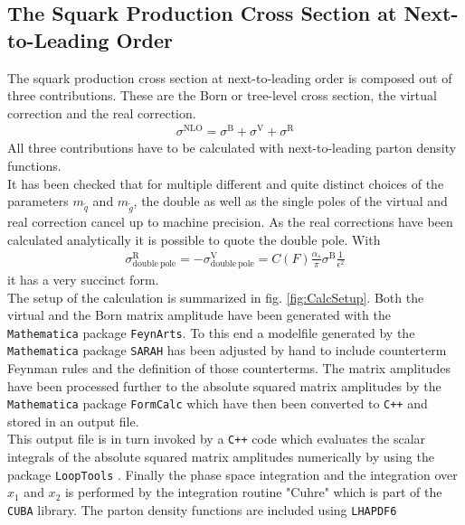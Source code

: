 \subsection{The Squark Production Cross Section at Next-to-Leading Order}
The squark production cross section at next-to-leading order is composed out of three contributions. These are the Born or tree-level cross section, the virtual correction and the real correction. 
\begin{align}
\sigma^{\mathrm{NLO}} = \sigma^{\mathrm{B}} + \sigma^{\mathrm{V}} + \sigma^{\mathrm{R}}\label{eq:BVR}
\end{align}
All three contributions have to be calculated with next-to-leading parton density functions.\\
It has been checked that for multiple different and quite distinct choices of the parameters $m_{\tilde{q}}$ and $m_{\tilde{g}}$, the double as well as the single poles of the virtual and real correction cancel up to machine precision. As the real corrections have been calculated analytically it is possible to quote the double pole. With
\begin{align}
\sigma^{\mathrm{R}}_{\mathrm{double\ pole}} = -\sigma^{\mathrm{V}}_{\mathrm{double\ pole}} = C(F)\frac{\alpha_s}{\pi}\sigma^{\mathrm{B}} \frac{1}{\epsilon^2}
\end{align}
it has a very succinct form. \\
The setup of the calculation is summarized in fig. \ref{fig:CalcSetup}. Both the virtual and the Born matrix amplitude have been generated with the \texttt{Mathematica} package \texttt{FeynArts}. To this end a modelfile generated by the \texttt{Mathematica} package \texttt{SARAH} has been adjusted by hand to include counterterm Feynman rules and the definition of those counterterms. The matrix amplitudes have been processed further to the absolute squared matrix amplitudes by the \texttt{Mathematica} package \texttt{FormCalc} which have then been converted to \texttt{C++} and stored in an output file.\\
This output file is in turn invoked by a \texttt{C++} code which evaluates the scalar integrals of the absolute squared matrix amplitudes numerically by using the package \texttt{LoopTools} \cite{Hahn:1998}. Finally the phase space integration and the integration over $x_1$ and $x_2$ is performed by the integration routine "Cuhre" which is part of the \texttt{CUBA} library\cite{Hahn:2004fe}. The parton density functions are included using \texttt{LHAPDF6}\cite{Buckley:2014ana}\\
